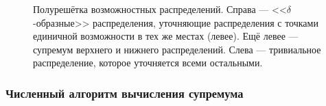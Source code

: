\begin{figure}[h]
\caption{\small Полурешётка возможностных распределений. Справа --- <<$\delta$-образные>> распределения, уточняющие распределения с точками единичной возможности в тех же местах (левее). Ещё левее --- супремум верхнего и нижнего распределений. Слева --- тривиальное распределение, которое уточняется всеми остальными. }
\label{ris:half_lattice}
\end{figure}

\subsubsection{Численный алгоритм вычисления супремума}
\label{algo_sup_poss}

